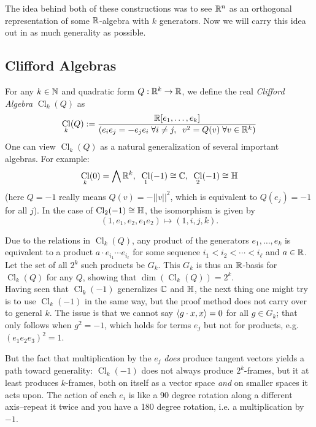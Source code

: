 \documentclass{amsart}
\DeclareMathOperator{\Cl}{\mathrm{Cl}}
\begin{document}
	The idea behind both of these constructions was to see $\mathbb{R}^n$ as an orthogonal representation of some $\mathbb{R}$-algebra with $k$ generators. Now we will carry this idea out in as much generality as possible.
	
	\subsection{Clifford Algebras}
	For any $k\in \mathbb{N}$ and quadratic form $Q:\mathbb{R}^k\to \mathbb{R}$, we define the real \textit{Clifford Algebra} $\Cl_k(Q)$ as
	$$
	\Cl_k(Q) := \frac{\R[e_1,\dots,e_k]}{(e_ie_j=-e_je_i \; \forall i\neq j, \;\; v^2 = Q(v) \; \forall v\in \R^k)}
	$$
	One can view $\Cl_k(Q)$ as a natural generalization of several important algebras. For example:
	$$
	\Cl_k(0) = \bigwedge \R^k, \;\; \Cl_1(-1) \cong \C, \;\; \Cl_2(-1) \cong \HH
	$$
	(here $Q=-1$ really means $Q(v)=-||v||^2$, which is equivalent to $Q(e_j)=-1$ for all $j$). In the case of $\Cl_2(-1)\cong \HH$, the isomorphism is given by
	$$
	(1,e_1,e_2,e_1e_2) \mapsto (1,i,j,k).
	$$
	
	Due to the relations in $\Cl_k(Q)$, any product of the generators $e_1,\dots,e_k$ is equivalent to a product $a\cdot  e_{i_1}\cdots e_{i_{\ell}}$ for some sequence $i_1 < i_2 <\cdots < i_{\ell}$ and $a\in \mathbb{R}$. Let the set of all $2^k$ such products be $G_k$. This $G_k$ is thus an $\mathbb{R}$-basis for $\Cl_k(Q)$ for any $Q$, showing that $\dim(\Cl_k(Q))=2^k$.\\
	
	Having seen that $\Cl_k(-1)$ generalizes $\mathbb{C}$ and $\mathbb{H}$, the next thing one might try is to use $\Cl_k(-1)$ in the same way, but the proof method does not carry over to general $k$. The issue is that we cannot say $\langle g\cdot x,x\rangle=0$ for all $g\in G_k$; that only follows when $g^2=-1$, which holds for terms $e_j$ but not for products, e.g. $(e_1e_2e_3)^2=1$.
	
	But the fact that multiplication by the $e_j$ \textit{does} produce tangent vectors yields a path toward generality: $\Cl_k(-1)$ does not always produce $2^k$-frames, but it at least produces $k$-frames, both on itself as a vector space \textit{and} on smaller spaces it acts upon. The action of each $e_i$ is like a 90 degree rotation along a different axis--repeat it twice and you have a 180 degree rotation, i.e. a multiplication by $-1$.\\
	
\end{document}
